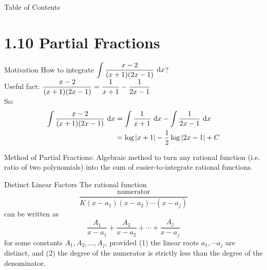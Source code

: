 

 \begin{frame}{Table of Contents }
\mapofcontentsA{\aj,\atech}
 \end{frame}

\section{1.10 Partial Fractions}
\begin{frame}{Motivation}
How to integrate $\displaystyle\int\frac{x-2}{(x+1)(2x-1)}~\text{d} x$? \pause\\\vfill
Useful fact: $\displaystyle\frac{x-2}{(x+1)(2x-1)}=\frac{1}{x+1}-\frac{1}{2x-1}$\\\vfill\pause
So: 
\begin{align*}
\int\frac{x-2}{(x+1)(2x-1)}~\text{d} x &= \int\frac{1}{x+1}~\text{d} x-\int\frac{1}{2x-1}~\text{d} x\\
&=\log|x+1|-\frac12\log|2x-1|+C\end{align*}\vfill\pause

Method of Partial Fractions: \alert{Algebraic method} to turn any rational function (i.e. ratio of two polynomials) into the sum of easier-to-integrate rational functions.
\end{frame}
\begin{frame}{Distinct Linear Factors}
The rational function \[\frac{\text{numerator}}{K(x-a_1)(x-a_2)\cdots(x-a_j)}\]
can be written as \[\frac{A_1}{x-a_1}+\frac{A_2}{x-a_2}+\cdots+\frac{A_j}{x-a_j}\]
 for some constants $A_1,A_2,\ldots,A_j$, provided 
 \vfill
 (1) the linear roots $a_1,\cdots a_j$ are distinct, and 
 \vfill
 (2) the degree of the numerator is strictly less than the degree of the denominator.

\end{frame}
